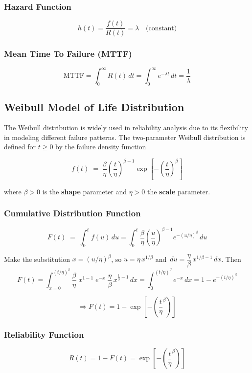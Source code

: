 \documentclass[twoside]{book}
\begin{document}
\subsubsection{Hazard Function}
$$h(t) =\dfrac{f(t)}{R(t)}= \lambda \quad \text{(constant)}$$


\subsubsection{Mean Time To Failure (MTTF)}
\[
\text{MTTF} = \int_0^\infty R(t)\, dt= \int_0^\infty e^{-\lambda t} \, dt = \frac{1}{\lambda}
\]

\subsection{Weibull Model of Life Distribution}

The Weibull distribution is widely used in reliability analysis due to its flexibility in modeling different failure patterns. The two‐parameter Weibull distribution is defined for \(t \ge 0\) by the failure density function
\begin{textbox}
\[
f(t) \;=\; \dfrac{\beta}{\eta}\left( \dfrac{t}{\eta}\right)^{\beta-1}
\exp\left[-\left( \dfrac{t}{\eta}\right)^\beta\right]
\]
\end{textbox}
where \(\beta>0\) is the \textbf{shape} parameter and \(\eta>0\) the \textbf{scale} parameter.

\medskip

\subsubsection{Cumulative Distribution Function}
\[
F(t)\;=\;\int_0^t f(u)\,du
=\int_0^t \dfrac{\beta}{\eta}\left( \dfrac{u}{\eta}\right) ^{\beta-1}
e^{-(u/\eta)^\beta}\,du
\]

Make the substitution \(x=(u/\eta)^\beta\), so \(u = \eta\,x^{1/\beta}\) and
\(\,du = \dfrac{\eta}{\beta}\,x^{1/\beta - 1}\,dx\).  Then
\[
F(t)
= \int_{x=0}^{(t/\eta)^\beta}
\frac{\beta}{\eta}\;x^{1 - 1}\;e^{-x}\;\dfrac{\eta}{\beta}\,x^{\tfrac{1}{\beta}-1}\,dx
= \int_{0}^{(t/\eta)^\beta} e^{-x}\,dx
= 1 - e^{-(t/\eta)^\beta}
\]

\[
\Rightarrow F(t) = 1 - \exp\left[-\left( \dfrac{t}{\eta}^\beta\right)\right]
\]

\subsubsection{Reliability Function}
$$R(t) = 1-F(t) =  \exp\left[-\left( \dfrac{t}{\eta}^\beta\right)\right]$$
\end{document}
